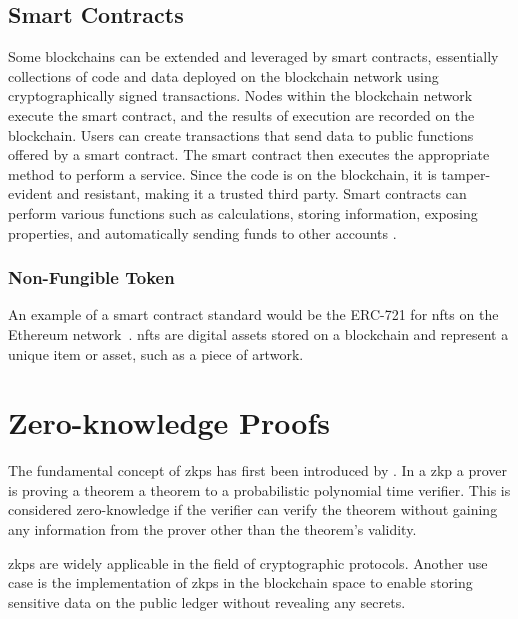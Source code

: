 \subsection{Smart Contracts}
Some blockchains can be extended and leveraged by smart contracts, essentially collections of code and data deployed on the blockchain network using cryptographically signed transactions. Nodes within the blockchain network execute the smart contract, and the results of execution are recorded on the blockchain. Users can create transactions that send data to public functions offered by a smart contract. The smart contract then executes the appropriate method to perform a service. Since the code is on the blockchain, it is tamper-evident and resistant, making it a trusted third party. Smart contracts can perform various functions such as calculations, storing information, exposing properties, and automatically sending funds to other accounts \parencite{blockchainoverview}.

\subsubsection{Non-Fungible Token}
An example of a smart contract standard would be the ERC-721 for \glspl{nft} on the Ethereum network~\cite{erc721}. \glspl{nft} are digital assets stored on a blockchain and represent a unique item or asset, such as a piece of artwork. 

\section{Zero-knowledge Proofs}
The fundamental concept of \glspl{zkp} has first been introduced by \textcite{goldwasserzkp}. In a \gls{zkp} a prover is proving a theorem a theorem to a probabilistic polynomial time verifier. \cite{zkpdefinitions} This is considered zero-knowledge if the verifier can verify the theorem without gaining any information from the prover other than the theorem's validity.

\glspl{zkp} are widely applicable in the field of cryptographic protocols. \cite{zkpexamples} Another use case is the implementation of \glspl{zkp} in the blockchain space to enable storing sensitive data on the public ledger without revealing any secrets.

